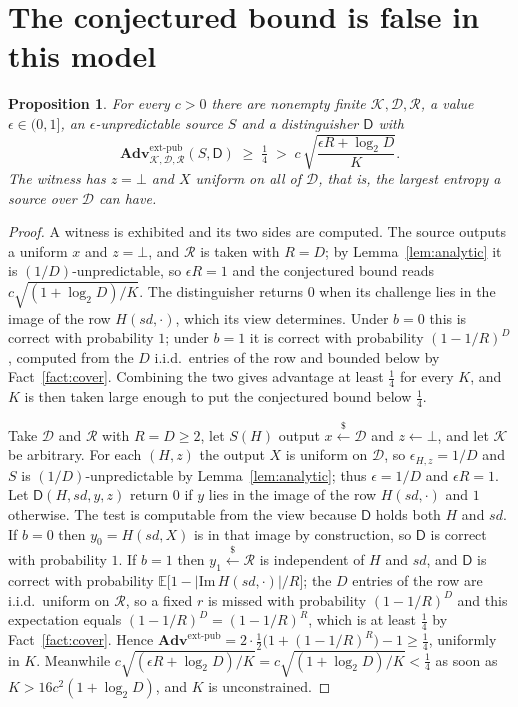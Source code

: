 \documentclass[11pt,a4paper]{article}
\theoremstyle{plain}
\newtheorem{proposition}[theorem]{Proposition}
\theoremstyle{definition}
\theoremstyle{remark}
\newcommand{\Adv}{\mathbf{Adv}}
\newcommand{\extp}{\mathrm{ext}\text{-}\mathrm{pub}}
\newcommand{\sd}{\mathit{sd}}
\newcommand{\sample}{\stackrel{{\scriptscriptstyle\$}}{\leftarrow}}
\newcommand{\calK}{\mathcal{K}}
\newcommand{\calD}{\mathcal{D}}
\newcommand{\calR}{\mathcal{R}}
\begin{document}
\section{The conjectured bound is false in this model}\label{sec:false}

\begin{proposition}\label{prop:false}
For every $c > 0$ there are nonempty finite $\calK, \calD, \calR$, a value $\epsilon \in (0,1]$, an
$\epsilon$-unpredictable source $S$ and a distinguisher $\mathsf{D}$ with
\[
  \Adv^{\extp}_{\calK,\calD,\calR}(S,\mathsf{D}) \;\ge\; \tfrac14
  \;>\; c\,\sqrt{\frac{\epsilon R + \log_2 D}{K}} .
\]
The witness has $z = \bot$ and $X$ uniform on all of $\calD$, that is, the largest entropy a
source over $\calD$ can have.
\end{proposition}

\begin{proof}
A witness is exhibited and its two sides are computed. The source outputs a uniform $x$ and
$z = \bot$, and $\calR$ is taken with $R = D$; by Lemma~\ref{lem:analytic} it is
$(1/D)$-unpredictable, so $\epsilon R = 1$ and the conjectured bound reads
$c\sqrt{(1+\log_2 D)/K}$. The distinguisher returns $0$ when its challenge lies in the image of the
row $H(\sd,\cdot)$, which its view determines. Under $b = 0$ this is correct with probability $1$;
under $b = 1$ it is correct with probability $(1-1/R)^{D}$, computed from the $D$ i.i.d.\ entries
of the row and bounded below by Fact~\ref{fact:cover}. Combining the two gives advantage at least $\tfrac14$ for every $K$, and $K$ is then
taken large enough to put the conjectured bound below $\tfrac14$.

Take $\calD$ and $\calR$ with $R = D \ge 2$, let $S(H)$ output $x \sample \calD$ and
$z \leftarrow \bot$, and let $\calK$ be arbitrary. For each $(H,z)$ the output $X$ is uniform on
$\calD$, so $\epsilon_{H,z} = 1/D$ and $S$ is $(1/D)$-unpredictable by
Lemma~\ref{lem:analytic}; thus $\epsilon = 1/D$ and $\epsilon R = 1$. Let $\mathsf{D}(H,\sd,y,z)$
return $0$ if $y$ lies in the image of the row $H(\sd,\cdot)$ and $1$ otherwise. The test is
computable from the view because $\mathsf{D}$ holds both $H$ and $\sd$. If $b = 0$ then
$y_0 = H(\sd,X)$ is in that image by construction, so $\mathsf{D}$ is correct with probability $1$.
If $b = 1$ then $y_1 \sample \calR$ is independent of $H$ and $\sd$, and $\mathsf{D}$ is correct
with probability $\mathbb{E}\bigl[1 - |\mathrm{Im}\,H(\sd,\cdot)|/R\bigr]$; the $D$ entries of the
row are i.i.d.\ uniform on $\calR$, so a fixed $r$ is missed with probability $(1-1/R)^{D}$ and this
expectation equals $(1-1/R)^{D} = (1-1/R)^{R}$, which is at least $\tfrac14$ by
Fact~\ref{fact:cover}. Hence
$\Adv^{\extp} = 2 \cdot \tfrac12\bigl(1 + (1-1/R)^{R}\bigr) - 1 \ge \tfrac14$, uniformly in $K$.
Meanwhile $c\sqrt{(\epsilon R + \log_2 D)/K} = c\sqrt{(1+\log_2 D)/K} < \tfrac14$ as soon as
$K > 16c^{2}(1 + \log_2 D)$, and $K$ is unconstrained.
\end{proof}
\end{document}
